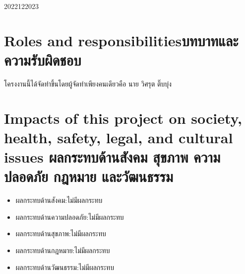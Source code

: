 \begin{plan}{12}{2022}{12}{2023}
\end{plan}

\section{\ifenglish Roles and responsibilities\else บทบาทและความรับผิดชอบ\fi}
โครงงานนี้ได้จัดทำขึ้นโดยผู้จัดทำเพียงคนเดียวคือ นาย วิศรุต ติ๊บบุ่ง

\section{\ifenglish%
Impacts of this project on society, health, safety, legal, and cultural issues
\else%
ผลกระทบด้านสังคม สุขภาพ ความปลอดภัย กฎหมาย และวัฒนธรรม
\fi}
\begin{itemize}
    \item ผลกระทบด้านสังคม:ไม่มีผลกระทบ
    \item ผลกระทบด้านความปลอดภัย:ไม่มีผลกระทบ
    \item ผลกระทบด้านสุขภาพ:ไม่มีผลกระทบ
    \item ผลกระทบด้านกฎหมาย:ไม่มีผลกระทบ
    \item ผลกระทบด้านวัฒนธรรม:ไม่มีผลกระทบ
\end{itemize}
